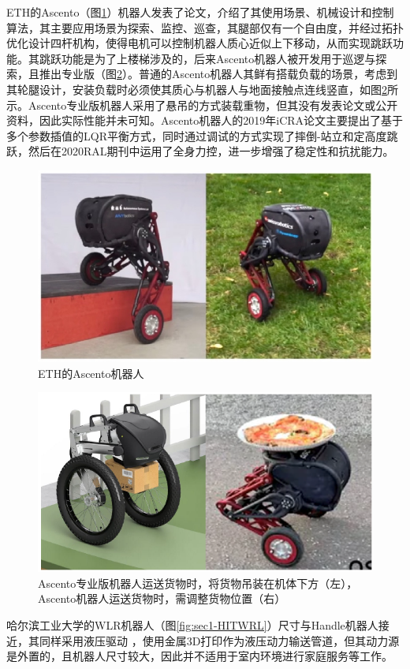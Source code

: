 ETH的Ascento（图\ref{fig:sec1-Ascento}）机器人发表了论文，介绍了其使用场景、机械设计和控制算法，其主要应用场景为探索、监控、巡查，其腿部仅有一个自由度，并经过拓扑优化设计四杆机构，使得电机可以控制机器人质心近似上下移动，从而实现跳跃功能。其跳跃功能是为了上楼梯涉及的，后来Ascento机器人被开发用于巡逻与探索，且推出专业版（图\ref{fig:sec1-AscentoPizza}）。普通的Ascento机器人其鲜有搭载负载的场景，考虑到其轮腿设计，安装负载时必须使其质心与机器人与地面接触点连线竖直，如图\ref{fig:sec1-AscentoPizza}所示。Ascento专业版机器人采用了悬吊的方式装载重物，但其没有发表论文或公开资料，因此实际性能并未可知。Ascento机器人的2019年iCRA\cite{klemm2019ascento}论文主要提出了基于多个参数插值的LQR平衡方式，同时通过调试的方式实现了摔倒-站立和定高度跳跃，然后在2020RAL\cite{klemm2020lqr}期刊中运用了全身力控，进一步增强了稳定性和抗扰能力。

\begin{figure}
  \centering
  \includegraphics[width=0.5\linewidth]{figures/Sec1/Ascento.png}
  \caption{
  ETH的Ascento机器人\cite{klemm2019ascento} \cite{klemm2020lqr}
  }
  \label{fig:sec1-Ascento}
   \vspace{6pt}
\end{figure}

\begin{figure}
  \centering
  \includegraphics[width=0.5\linewidth]{figures/Sec1/AscentoPizza.png}
  \caption{
  Ascento专业版\cite{ascentopro}机器人运送货物时，将货物吊装在机体下方（左），Ascento机器人运送货物时，需调整货物位置（右）
  }
  \label{fig:sec1-AscentoPizza}
   \vspace{6pt}
\end{figure}


哈尔滨工业大学的WLR机器人（图\ref{fig:sec1-HITWRL}）尺寸与Handle机器人接近，其同样采用液压驱动 ，使用金属3D打印作为液压动力输送管道，但其动力源是外置的，且机器人尺寸较大，因此并不适用于室内环境进行家庭服务等工作。

